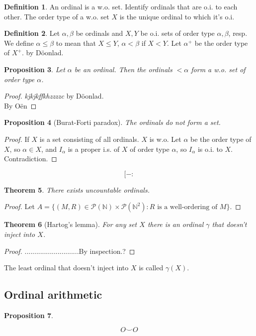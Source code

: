 \documentclass{article}
\theoremstyle{definition}
\newtheorem{defn}{Definition}[section]
\theoremstyle{remark}
\theoremstyle{plain}
\newtheorem{thm}[defn]{Theorem}
\newtheorem{prop}[defn]{Proposition}
\newcommand{\NN}{\mathbb{N}}
\begin{document}
\begin{defn}
    An ordinal is a w.o. set. Identify ordinals that are o.i. to each other. The order type of a w.o. set $X$ is the unique ordinal to which it's o.i.
\end{defn}
\begin{defn}
    Let $\alpha,\beta$ be ordinals and $X, Y$ be o.i. sets of order type $\alpha,\beta$, resp. We define $\alpha\le\beta$ to mean that $X\le Y$, $\alpha<\beta$ if $X<Y$. Let $\alpha^+$ be the order type of $X^+$.  by D\"oonlad.
\end{defn}

\begin{prop}
    Let $\alpha$ be an ordinal. Then the ordinals \(<\alpha\) form a w.o. set of order type $\alpha$.
\end{prop}
\begin{proof}
    \textit{kjkjkffkhzzzzc} by D\"oonlad.\\
     By O\"en
\end{proof}
\begin{prop}[Burat-Forti paradox]
    The ordinals do not form a set.
\end{prop}
\begin{proof}
    If $X$ is a set consisting of all ordinals. $X$ is w.o. Let $\alpha$ be the order type of $X$, so $\alpha\in X$, and $I_\alpha$ is a proper i.s. of $X$ of order type $\alpha$, so $I_\alpha$ is o.i. to $X$. Contradiction.
\end{proof}
\[[-:\tag{Owen's Signature}\]
\begin{thm}
    There exists uncountable ordinals.
\end{thm}
\begin{proof}
    Let $A=\{(M,R)\in \mathscr P(\NN)\times\mathscr P(\NN^2):R\text{ is a well-ordering of }M\}$.
\end{proof}
\begin{thm}[Hartog's lemma]
    For any set $X$ there is an ordinal $\gamma$ that doesn't inject into $X$.
\end{thm}
\begin{proof}
    ............................By inspection.?
\end{proof}
The least ordinal that doesn't inject into $X$ is called $\gamma(X)$.
\subsection*{Ordinal arithmetic}
\begin{prop}
    
\end{prop}
\[O\smile O\tag{Owen's signature}\]
\end{document}

